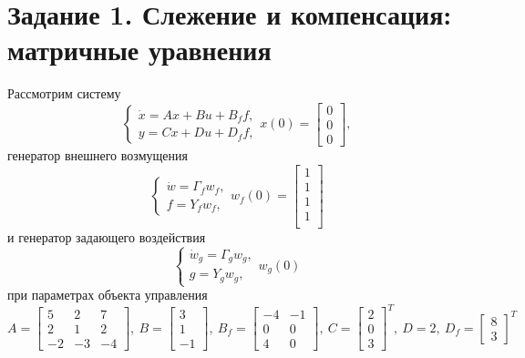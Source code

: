\documentclass[a4paper, 12pt]{article}
\begin{document}
    \section{Задание 1. Слежение и компенсация: матричные уравнения}
    Рассмотрим систему
    $$
    \begin{cases}
        \dot{x}=Ax+Bu+B_ff,\\
        y=Cx+Du+D_ff,
    \end{cases} x(0)=\begin{bmatrix}
        0\\0\\0
    \end{bmatrix},
    $$
    генератор внешнего возмущения
    $$
    \begin{cases}
        \dot{w}=\Gamma_f w_f,\\
        f=Y_fw_f,
    \end{cases} w_f(0)=\begin{bmatrix}
        1\\1\\1\\1\\
    \end{bmatrix}
    $$
    и генератор задающего воздействия
    $$
    \begin{cases}
        \dot{w}_g=\Gamma_gw_g,\\
        g=Y_gw_g,
    \end{cases} w_g(0)
    $$
    при параметрах объекта управления
    $$
    A=\begin{bmatrix}
        5 &2 &7\\
        2 &1 &2\\
        -2 &-3 &-4
    \end{bmatrix},\ B=\begin{bmatrix}
        3\\1\\-1
    \end{bmatrix},\ B_f=\begin{bmatrix}
        -4 &-1\\
        0 &0\\
        4 &0
    \end{bmatrix},\ C=\begin{bmatrix}
        2\\0\\3
    \end{bmatrix}^T,\ D=2,\ D_f=\begin{bmatrix}
        8\\3
    \end{bmatrix}^T
    $$
\end{document}
